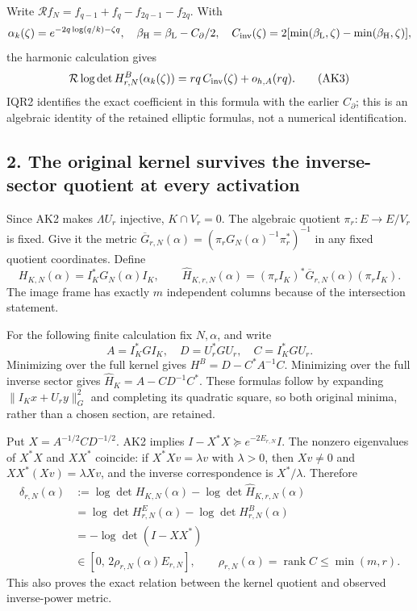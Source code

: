 Write \(\mathcal R f_N=f_{q-1}+f_q-f_{2q-1}-f_{2q}\). With \[
\alpha_k(\zeta)=e^{-2q\log(q/k)-\zeta q},\quad
\beta_{\rm H}=\beta_{\rm L}-C_\partial/2,
\quad
C_{\rm inv}(\zeta)=2[\min(\beta_{\rm L},\zeta)-\min(\beta_{\rm H},\zeta)],
\] the harmonic calculation gives \[
\mathcal R\log\det H^B_{r,N}(\alpha_k(\zeta))
 =rq\,C_{\rm inv}(\zeta)+o_{h,A}(rq). \tag{AK3}
\] IQR2 identifies the exact coefficient in this formula with the earlier \(C_\partial\); this is an algebraic identity of the retained elliptic formulas, not a numerical identification.

\subsection{2. The original kernel survives the inverse-sector quotient at every activation}\label{the-original-kernel-survives-the-inverse-sector-quotient-at-every-activation}

Since AK2 makes \(\Lambda U_r\) injective, \(K\cap V_r=0\). The algebraic quotient \(\pi_r:E\to E/V_r\) is fixed. Give it the metric \(\overline G_{r,N}(\alpha)=(\pi_rG_N(\alpha)^{-1}\pi_r^*)^{-1}\) in any fixed quotient coordinates. Define \[
H_{K,N}(\alpha)=I_K^*G_N(\alpha)I_K,\qquad
\widehat H_{K,r,N}(\alpha)
 =(\pi_r I_K)^*\overline G_{r,N}(\alpha)(\pi_r I_K).
\tag{AK4}
\] The image frame has exactly \(m\) independent columns because of the intersection statement.

For the following finite calculation fix \(N,\alpha\), and write \[
A=I_K^*GI_K,\quad D=U_r^*GU_r,\quad C=I_K^*GU_r.
\] Minimizing over the full kernel gives \(H^B=D-C^*A^{-1}C\). Minimizing over the full inverse sector gives \(\widehat H_K=A-CD^{-1}C^*\). These formulas follow by expanding \(\|I_Kx+U_ry\|_G^2\) and completing its quadratic square, so both original minima, rather than a chosen section, are retained.

Put \(X=A^{-1/2}CD^{-1/2}\). AK2 implies \(I-X^*X\succeq e^{-2E_{r,N}}I\). The nonzero eigenvalues of \(X^*X\) and \(XX^*\) coincide: if \(X^*Xv=\lambda v\) with \(\lambda>0\), then \(Xv\ne0\) and \(XX^*(Xv)=\lambda Xv\), and the inverse correspondence is \(X^*/\lambda\). Therefore \[
\begin{split}
\delta_{r,N}(\alpha)
&:=\log\det H_{K,N}(\alpha)-\log\det\widehat H_{K,r,N}(\alpha)\\
&=\log\det H^E_{r,N}(\alpha)-\log\det H^B_{r,N}(\alpha)\\
&=-\log\det(I-XX^*)\\
&\in[0,\,2\rho_{r,N}(\alpha)E_{r,N}],
\qquad \rho_{r,N}(\alpha)=\operatorname{rank}C\le\min(m,r).
\end{split}\tag{AK5}
\] This also proves the exact relation between the kernel quotient and observed inverse-power metric.

